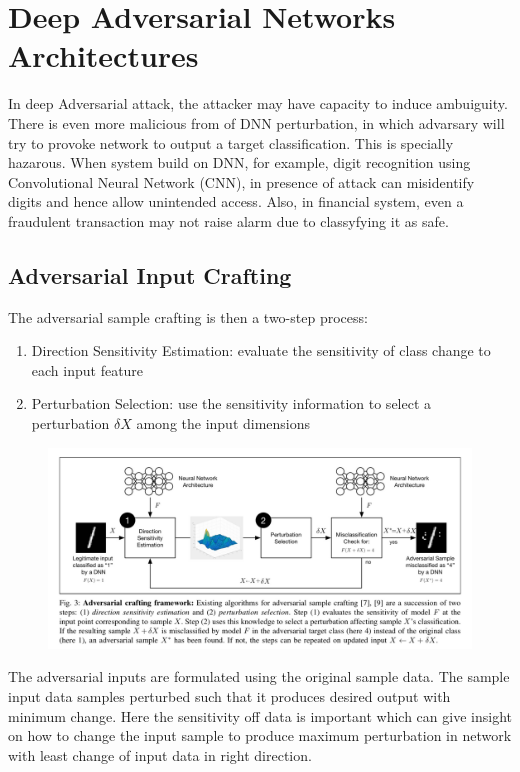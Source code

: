 \documentclass[12pt]{article}
\begin{document}
\section*{Deep Adversarial Networks Architectures}
In deep Adversarial attack, the attacker may have capacity to induce ambuiguity. There is even more malicious from of DNN perturbation, in which advarsary will try to provoke network to output a target classification. This is specially hazarous. When system build on DNN, for example, digit recognition using Convolutional Neural Network (CNN), in presence of attack can misidentify digits and hence allow unintended access. Also, in financial system, even a fraudulent transaction may not raise alarm due to classyfying it as safe.  
\subsection*{Adversarial Input Crafting}
The adversarial sample crafting is then a two-step process:
\begin{enumerate}
\item Direction Sensitivity Estimation: evaluate the sensitivity
of class change to each input feature
\item Perturbation Selection: use the sensitivity information to
select a perturbation $\delta X$ among the input dimensions
\end{enumerate}
\begin{figure}[H]
\begin{center}
\includegraphics[scale=.25]{distillation-defense-fig-3}
\end{center}
\end{figure} 
The adversarial inputs are formulated using the original sample data. The sample input data samples perturbed such that it produces desired output with minimum change. Here the sensitivity off data is important which can give insight on how to change the input sample to produce maximum perturbation in network with least change of input data in right direction.
\end{document}
